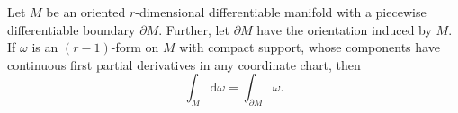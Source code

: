 \documentclass[12pt]{article}
\newcommand{\dd}{\mathrm{d}}
\begin{document}
Let $M$ be an oriented $r$-dimensional differentiable manifold with 
a piecewise differentiable boundary $\partial M$. Further,  let $\partial M$ have the
orientation induced by  $M$.  
If $\omega$ is an $(r-1)$-form on $M$ with compact support, whose components 
have continuous first partial derivatives in any coordinate chart, then
\[ \int_M \dd \omega = \int_{\partial M} \omega.\]
\end{document}
